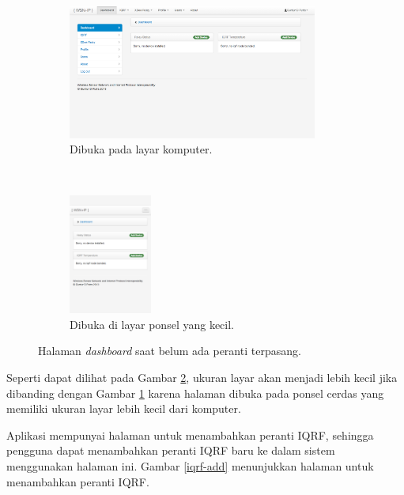 				\begin{figure}[H]
					\begin{subfigure}[b]{\textwidth}
						\centering
					    \includegraphics[width=0.9\textwidth]{gambar/dashboard}
					    \caption{Dibuka pada layar komputer.}
					    \label{dashboard-full-page}
					\end{subfigure}
					 ~
					\begin{subfigure}[b]{\textwidth}
						\centering
					    \includegraphics[width=0.3\textwidth]{gambar/dashboard-small}
					    \caption{Dibuka di layar ponsel yang kecil.}
					    \label{dashboard-small}
					\end{subfigure}
					\caption{Halaman \emph{dashboard} saat belum ada peranti terpasang.}
					\label{dashboard}
				\end{figure}

			Seperti dapat dilihat pada Gambar \ref{dashboard-small}, ukuran layar akan menjadi lebih kecil jika dibanding dengan Gambar \ref{dashboard-full-page} karena halaman dibuka pada ponsel cerdas yang memiliki ukuran layar lebih kecil dari komputer.

			Aplikasi mempunyai halaman untuk menambahkan peranti IQRF, sehingga pengguna dapat menambahkan peranti IQRF baru ke dalam sistem menggunakan halaman ini. Gambar \ref{iqrf-add} menunjukkan halaman untuk menambahkan peranti IQRF.


